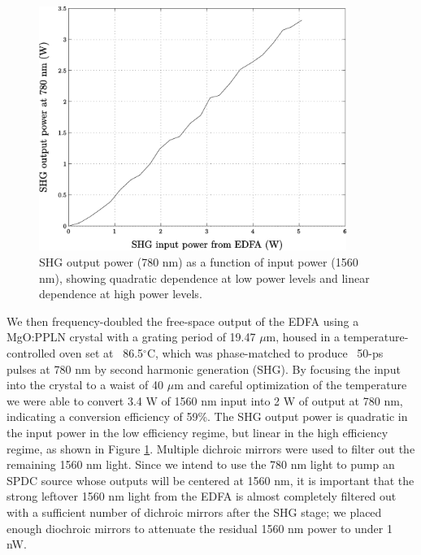 \begin{figure}[h]
\begin{center}
\includegraphics[width=10cm]{figure-pcoct-shg.pdf}
\caption{SHG output power (780 nm) as a function of input power (1560 nm), showing quadratic dependence at low power levels and linear dependence at high power levels.}
\label{figure:pcoct-shg}
\end{center}
\end{figure}

We then frequency-doubled the free-space output of the EDFA using a MgO:PPLN crystal with a grating period of 19.47 $\mu$m, housed in a temperature-controlled oven set at ~86.5$^\circ$C, which was phase-matched to produce ~50-ps pulses at 780 nm by second harmonic generation (SHG). By focusing the input into the crystal to a waist of 40 $\mu$m and careful optimization of the temperature we were able to convert 3.4 W of 1560 nm input into 2 W of output at 780 nm, indicating a conversion efficiency of 59\%. The SHG output power is quadratic in the input power in the low efficiency regime, but linear in the high efficiency regime, as shown in Figure \ref{figure:pcoct-shg}. Multiple dichroic mirrors were used to filter out the remaining 1560 nm light. Since we intend to use the 780 nm light to pump an SPDC source whose outputs will be centered at 1560 nm, it is important that the strong leftover 1560 nm light from the EDFA is almost completely filtered out with a sufficient number of dichroic mirrors after the SHG stage; we placed enough diochroic mirrors to attenuate the residual 1560 nm power to under 1 nW.

